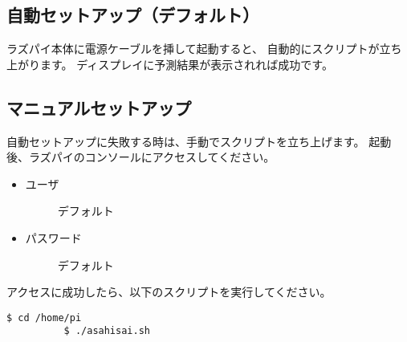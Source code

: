 \documentclass{jsarticle}
\begin{document}
\begin{multicols}{2}
      \subsection{自動セットアップ（デフォルト）}

        ラズパイ本体に電源ケーブルを挿して起動すると、
        自動的にスクリプトが立ち上がります。
        ディスプレイに予測結果が表示されれば成功です。

      \subsection{マニュアルセットアップ}

        自動セットアップに失敗する時は、手動でスクリプトを立ち上げます。
        起動後、ラズパイのコンソールにアクセスしてください。

        \begin{itemize}
          \item \begin{description} \item[ユーザ]デフォルト \end{description}
          \item \begin{description} \item[パスワード]デフォルト \end{description}
        \end{itemize}
        
        アクセスに成功したら、以下のスクリプトを実行してください。
        \begin{lstlisting}[caption=起動スクリプト,label=setup]
          $ cd /home/pi
          $ ./asahisai.sh
        \end{lstlisting}

    
  \end{multicols}
\end{document}
